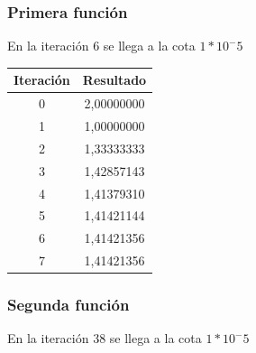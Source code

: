 \documentclass[titlepage,a4paper]{article}
\begin{document}
\subsubsection{Primera función}\label{sec:sec1}
En la iteración 6 se llega a la cota $1*10^-5$
\begin{center}
    \begin{tabular}{| c | c |}
    \hline
     Iteración & Resultado \\ \hline
        0     & 2,00000000 \\
        1     & 1,00000000 \\
        2     & 1,33333333 \\
        3     & 1,42857143 \\
        4     & 1,41379310 \\
        5     & 1,41421144 \\
        6     & 1,41421356 \\
        7     & 1,41421356 \\
    \hline
    \end{tabular}
\end{center}

\subsubsection{Segunda función}\label{sec:sec2}
En la iteración 38 se llega a la cota $1*10^-5$
\end{document}
